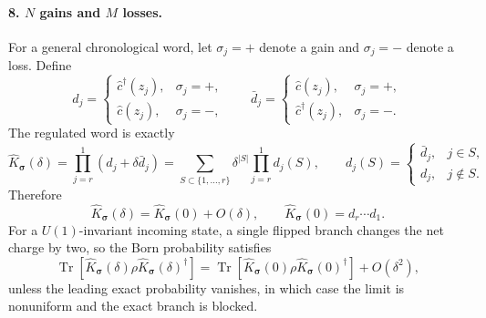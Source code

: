 \documentclass[aps,prb,onecolumn,nofootinbib,superscriptaddress]{revtex4-2}
\newcommand{\Tr}{\operatorname{Tr}}
\theoremstyle{plain}
\theoremstyle{definition}
\begin{document}
\paragraph*{8. \(N\) gains and \(M\) losses.}
For a general chronological word, let
\(\sigma_j=+\) denote a gain and \(\sigma_j=-\) denote a loss.  Define
\begin{equation}
  d_j=
  \begin{cases}
    \hat c^\dagger(z_j), & \sigma_j=+,\\
    \hat c(z_j), & \sigma_j=-,
  \end{cases}
  \qquad
  \bar d_j=
  \begin{cases}
    \hat c(z_j), & \sigma_j=+,\\
    \hat c^\dagger(z_j), & \sigma_j=- .
  \end{cases}
  \label{eq:general-word-d-and-dbar}
\end{equation}
The regulated word is exactly
\begin{equation}
  \hat K_{\bm\sigma}(\delta)
  =
  \prod_{j=r}^{1}\left(d_j+\delta\bar d_j\right)
  =
  \sum_{S\subset\{1,\ldots,r\}}
  \delta^{|S|}
  \prod_{j=r}^{1} d_j(S),
  \qquad
  d_j(S)=
  \begin{cases}
    \bar d_j, & j\in S,\\
    d_j, & j\notin S .
  \end{cases}
  \label{eq:general-gain-loss-regulated-expansion}
\end{equation}
Therefore
\begin{equation}
  \hat K_{\bm\sigma}(\delta)
  =
  \hat K_{\bm\sigma}(0)+O(\delta),
  \qquad
  \hat K_{\bm\sigma}(0)=d_r\cdots d_1 .
  \label{eq:general-gain-loss-leading-word}
\end{equation}
For a \(U(1)\)-invariant incoming state, a single flipped branch changes the
net charge by two, so the Born probability satisfies
\begin{equation}
  \Tr[\hat K_{\bm\sigma}(\delta)\rho\hat K_{\bm\sigma}(\delta)^\dagger]
  =
  \Tr[\hat K_{\bm\sigma}(0)\rho\hat K_{\bm\sigma}(0)^\dagger]
  +O(\delta^2),
  \label{eq:general-regulated-born-convergence}
\end{equation}
unless the leading exact probability vanishes, in which case the limit is
nonuniform and the exact branch is blocked.
\end{document}
